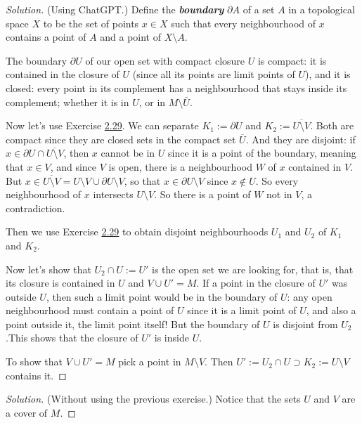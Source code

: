 \begin{proof}[Solution]\leavevmode
	(Using ChatGPT.) Define the \textit{\textbf{boundary}} \(\partial A\) of a set  \(A\) in a topological space \(X\) to be the set of points \(x \in X\) such that every neighbourhood of \(x\) contains a point of \(A\) and a point of \(X\setminus A\).

	The boundary \(\partial U\) of our open set with compact closure \(U\) is compact: it is contained in the closure of \(U\) (since all its points are limit points of \(U\)), and it is closed: every point in its complement has a neighbourhood that stays inside its complement; whether it is in \(U\), or in \(M\setminus \bar{U}\).

	Now let's use Exercise \hyperref[exer:2.29]{2.29}. We can separate \(K_1:=\partial U\) and \(K_2:=\overline{U \setminus V}\). Both are compact since they are closed sets in the compact set \(\overline{U}\). And they are disjoint: if \(x \in \partial U \cap \overline{U\setminus V}\), then \(x\) cannot be in \(U\) since it is a point of the boundary, meaning that \(x \in V\), and since \(V\) is open, there is a  neighbourhood \(W\) of \(x\) contained in \(V\). But \(x \in \overline{U \setminus V}=U\setminus V \cup \partial U\setminus V\), so that \(x \in \partial U \setminus V\) since \(x \not \in U\). So every neighbourhood of \(x\) intersects \(U\setminus V\). So there is a point of \(W\) not in \(V\), a contradiction.

	Then we use  Exercise \hyperref[exer:2.29]{2.29} to obtain disjoint neighbourhoods \(U_1\) and \(U_2\) of \(K_1\) and \(K_2\).

	Now let's show that \(U_2 \cap U:=U'\) is the open set we are looking for, that is, that its closure is contained in \(U\) and \(V \cup U'=M\). If a point in the closure of \(U'\) was outside \(U\), then such a limit point would be in the boundary of \(U\): any open neighbourhood must contain a point of \(U\) since it is a limit point of \(U\), and also a point outside it, the limit point itself! But the boundary of \(U\) is disjoint from  \(U_2\).This shows that the closure of \(U'\) is inside \(U\).

	To show that \(V \cup  U'=M\) pick a point in \(M \setminus V\). Then \(U':=U_2 \cap U\supset K_2:=U\setminus V\) contains it.
\end{proof}
\iffalse
\begin{proof}[Solution]\leavevmode
	(Without using the previous exercise.) Notice that the sets \(U\) and  \(V\) are a cover of \(M\).
\end{proof}

